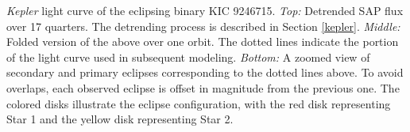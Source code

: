 \label{fig:keplerfig} \emph{Kepler} light curve of the eclipsing binary KIC 9246715. \emph{Top:} Detrended SAP flux over 17 quarters. The detrending process is described in Section \ref{kepler}. \emph{Middle:} Folded version of the above over one orbit. The dotted lines indicate the portion of the light curve used in subsequent modeling. \emph{Bottom:} A zoomed view of secondary and primary eclipses corresponding to the dotted lines above. To avoid overlaps, each observed eclipse is offset in magnitude from the previous one. The colored disks illustrate the eclipse configuration, with the red disk representing Star 1 and the yellow disk representing Star 2.
